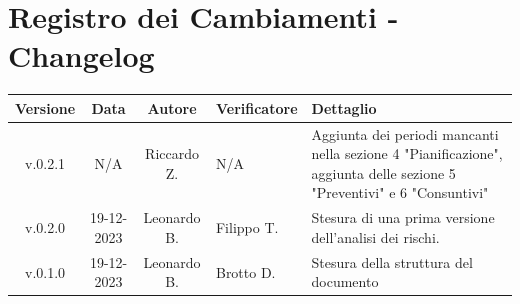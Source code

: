 \documentclass[12pt, oneside]{article}
\begin{document}
\section*{Registro dei Cambiamenti - Changelog}
\begin{tabular}{|c|c|c|p{3cm}|p{6cm}|}
\hline
\textbf{Versione} & \textbf{Data} & \textbf{Autore} & \textbf{Verificatore} & \textbf{Dettaglio} \\
\hline
v.0.2.1 & N/A & Riccardo Z. & N/A & Aggiunta dei periodi mancanti nella sezione 4 "Pianificazione", aggiunta delle sezione 5 "Preventivi" e 6 "Consuntivi" \\
\hline
v.0.2.0 & 19-12-2023 & Leonardo B. & Filippo T. & Stesura di una prima versione dell'analisi dei rischi. \\
\hline
v.0.1.0 & 19-12-2023 & Leonardo B. & Brotto D. & Stesura della struttura del documento \\
\hline
\end{tabular}
\newpage


\tableofcontents
\newpage

\newpage

\newpage

\newpage

\newpage

\newpage

\end{document}

